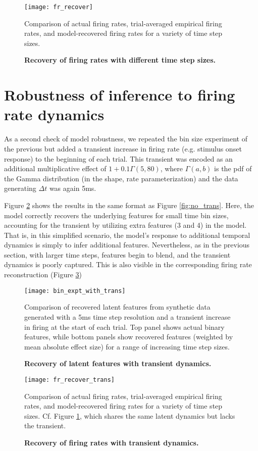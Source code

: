 \documentclass[10pt,letterpaper]{article}
\begin{document}
\begin{figure}[!ht]
    \texttt{[image: fr\_recover]}
	\caption{\bf Recovery of firing rates with different time step sizes.}
    Comparison of actual firing rates, trial-averaged empirical firing rates, and model-recovered firing rates for a variety of time step sizes.
	\label{fig:no_trans_fr}
\end{figure}

\section*{Robustness of inference to firing rate dynamics}
As a second check of model robustness, we repeated the bin size experiment of the previous but added a transient increase in firing rate (e.g. stimulus onset response) to the beginning of each trial. This transient was encoded as an additional multiplicative effect of $1 + 0.1\Gamma(5, 80)$, where $\Gamma(a, b)$ is the pdf of the Gamma distribution (in the shape, rate parameterization) and the data generating $\Delta t$ was again 5ms.

Figure \ref{fig:with_trans} shows the results in the same format as Figure \ref{fig:no_trans}. Here, the model correctly recovers the underlying features for small time bin sizes, accounting for the transient by utilizing extra features (3 and 4) in the model. That is, in this simplified scenario, the model's response to additional temporal dynamics is simply to infer additional features. Nevertheless, as in the previous section, with larger time steps, features begin to blend, and the transient dynamics is poorly captured. This is also visible in the corresponding firing rate reconstruction (Figure \ref{fig:with_trans_fr})

\begin{figure}[!ht]
    \texttt{[image: bin\_expt\_with\_trans]}
	\caption{\bf Recovery of latent features with transient dynamics.}
    Comparison of recovered latent features from synthetic data generated with a 5ms time step resolution and a transient increase in firing at the start of each trial. Top panel shows actual binary features, while bottom panels show recovered features (weighted by mean absolute effect size) for a range of increasing time step sizes.
	\label{fig:with_trans}
\end{figure}

\begin{figure}[!ht]
    \texttt{[image: fr\_recover\_trans]}
	\caption{\bf Recovery of firing rates with transient dynamics.}
    Comparison of actual firing rates, trial-averaged empirical firing rates, and model-recovered firing rates for a variety of time step sizes. Cf. Figure \ref{fig:no_trans_fr}, which shares the same latent dynamics but lacks the transient.
	\label{fig:with_trans_fr}
\end{figure}
\end{document}
